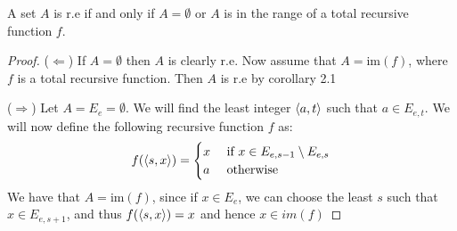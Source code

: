 \documentclass[../main.tex]{subfiles}
\begin{document}
\begin{thm}
	A set $A$ is r.e if and only if $A=\emptyset$ or $A$ is in the range of
	a total recursive function $f$. 
\end{thm}
\begin{proof}
	($\Leftarrow$) If $A=\emptyset$ then $A$ is clearly r.e. Now
	assume that $A=\text{im}(f)$, where $f$ is a total recursive function. Then
	$A$ is r.e by corollary 2.1

	($\Rightarrow$)
	Let $A=E_e=\emptyset$. We will find the least integer $\langle a,t\rangle$ such
	that $a\in E_{e,t}$. We will now define the following recursive
	function $f$ as:
	\[f(\langle s,x\rangle)=\begin{cases}
		x &\ \text{if}\ x\in E_{e,s-1}\setminus E_{e,s}\\
		a &\ \text{otherwise}
	\end{cases}\]
	We have that $A= \text{im} (f)$, since if $x\in E_e$, we can choose the least
	$s$ such that $x\in E_{e,s+1}$, and thus $f(\langle s,x\rangle)=x$ and hence
	$x\in im(f)$
\end{proof}
\end{document}
